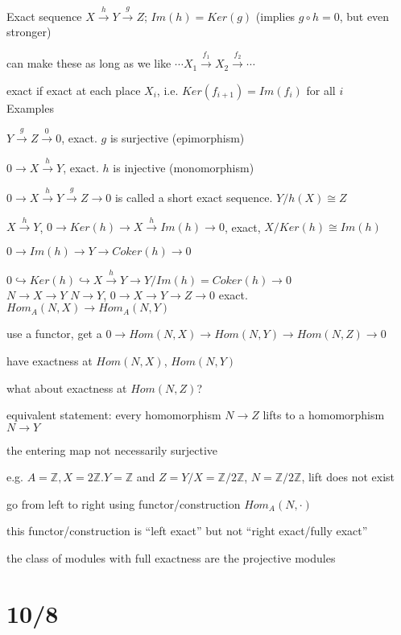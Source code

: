 \documentclass[12pt]{article}
\begin{document}
\noindent
Exact sequence $X \xrightarrow{h} Y \xrightarrow{g} Z$; $Im(h) = Ker(g)$ (implies $g \circ h = 0$, but even stronger)

can make these as long as we like $\cdots X_1 \xrightarrow{f_1} X_2 \xrightarrow{f_2} \cdots$

exact if exact at each place $X_i$, i.e. $Ker(f_{i + 1}) = Im(f_i)$ for all $i$\\

\noindent
Examples

\noindent
$Y \xrightarrow{g} Z \xrightarrow{0} 0$, exact.  $g$ is surjective (epimorphism)

\noindent
$0 \to X \xrightarrow{h} Y$, exact.  $h$ is injective (monomorphism)

\noindent
$0 \to X \xrightarrow{h} Y \xrightarrow{g} Z \to 0$ is called a short exact sequence.  $Y/h(X) \cong Z$

\noindent
$X \xrightarrow{h} Y$, $0 \to Ker(h) \to X \xrightarrow{h} Im(h) \to 0$, exact, $X/Ker(h) \cong Im(h)$

\noindent
$0 \to Im(h) \to Y \to Coker(h) \to 0$

\noindent
$0 \hookrightarrow Ker(h) \hookrightarrow X \xrightarrow{h} Y \to Y/Im(h) = Coker(h) \to 0$\\

\noindent
$N \to X \to Y$ $N \to Y$, $0 \to X \to Y \to Z \to 0$ exact.  $Hom_A(N, X) \to Hom_A(N, Y)$

use a functor, get a $0 \to Hom(N, X) \to Hom(N, Y) \to Hom(N, Z) \to 0$

have exactness at $Hom(N, X)$, $Hom(N, Y)$

what about exactness at $Hom(N, Z)$?

equivalent statement: every homomorphism $N \to Z$ lifts to a homomorphism $N \to Y$

the entering map not necessarily surjective

e.g. $A = \mathds{Z}, X = 2\mathds{Z}. Y = \mathds{Z}$ and $Z = Y/X = \mathds{Z}/2\mathds{Z}$, $N = \mathds{Z}/2\mathds{Z}$, lift does not exist

go from left to right using functor/construction $Hom_A(N, \cdot)$

this functor/construction is ``left exact'' but not ``right exact/fully exact''

the class of modules with full exactness are the projective modules

\section{10/8}
\end{document}
